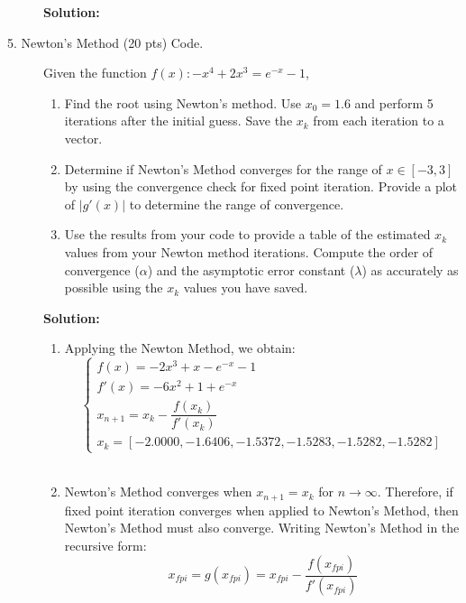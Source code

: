 \documentclass[12pt]{article}
\begin{document}
\begin{description}
\ifsolution
\color{red}
{\bf Solution:}\\
\color{black}
\fi
	

\item[5. Newton's Method (20 pts) Code.] Given the function $f(x): -x^4 + 2x^3 = e^{-x} - 1$,
	\begin{enumerate} [label=(\alph*)]
		\item Find the root using Newton's method. Use $x_0 = 1.6$ and perform 5 iterations after the initial guess. Save the $x_k$ from each iteration to a vector.
		\item 	Determine if Newton's Method converges for the range of $x \in [-3,3]$ by using the convergence check for fixed point iteration. Provide a plot of $|g'(x)|$ to determine the range of convergence.
		\item Use the results from your code to provide a table of the estimated $x_k$ values from your Newton method iterations. Compute the order of convergence ($\alpha$) and the asymptotic error constant ($\lambda$) as accurately as possible using the $x_k$ values you have saved.
	\end{enumerate}

\ifsolution
\color{red}
        {\bf Solution:}\\
        \begin{enumerate} [label=(\alph*)]
        	
        	\item Applying the Newton Method, we obtain: \\
        	\begin{equation*}
        	\begin{cases}
        	    f(x) = -2x^3 + x - e^{-x} - 1 \\
        		f'(x) = -6x^2 + 1 + e^{-x} \\
        	    x_{n+1} = x_k-\dfrac{f(x_k)}{f'(x_k)} \\
     		    x_k = [-2.0000, -1.6406, -1.5372, -1.5283, -1.5282, -1.5282]
     		\end{cases}
     		\end{equation*}
        		\\
        	
        		
	        \item Newton's Method converges when $x_{n+1} = x_k$ for $n \rightarrow \infty$. Therefore, if fixed point iteration converges when applied to Newton's Method, then Newton's Method must also converge.  Writing Newton's Method in the recursive form:
	        \begin{equation*}
	        	x_{fpi} = g(x_{fpi}) = x_{fpi}-\frac{f(x_{fpi})}{f'(x_{fpi})}
	        \end{equation*}
	        	

\end{enumerate}
\end{description}
\end{document}
